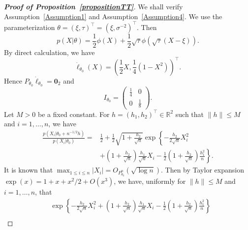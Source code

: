 \documentclass[11pt]{article}
\theoremstyle{plain}
\theoremstyle{definition}
\theoremstyle{remark}
\begin{document}
\begin{appendices}
\begin{proof}[\textbf{Proof of Proposition~\ref{propositionTT}}]
We shall verify Assumption~\ref{Assumption1} and Assumption~\ref{Assumption4}.
We use the parameterization
$
\theta=(\xi,\tau)^\top  =(\xi,\sigma^{-2})^\top $.
Then
\begin{equation*}
    p(X|\theta)=\frac{1}{2}\phi(X)+\frac{1}{2}\sqrt{\tau} \phi(\sqrt{\tau}(X-\xi)).
\end{equation*}
By direct calculation, we have 
\begin{equation*}
    \dot{\ell}_{\theta_0}(X)=\left(\frac{1}{2}X,\frac{1}{4}(1-X^2)\right)^\top .
\end{equation*}
Hence $P_{\theta_0}\dot{\ell}_{\theta_0}=\mathbf{0}_2$ and
\begin{equation*}
    I_{\theta_0}=\begin{pmatrix}
        \frac{1}{4} & 0\\
        0& \frac{1}{8}
    \end{pmatrix}.
\end{equation*}
Let $M>0$ be a fixed constant.  For $h=(h_1,h_2)^\top \in \mathbb{R}^2$ such that $\|h\|\leq M$ and $i=1,\ldots, n$, we have
\begin{equation*}
    \begin{split}
    \frac{p(X_i|\theta_0+n^{-1/2}h)}{p(X_i|\theta_0)}
    =&
    \frac{1}{2}+\frac{1}{2}\sqrt{1+\frac{h_2}{\sqrt{n}}} \exp\left\{-\frac{h_2}{2\sqrt{n}}X_i^2
    \right.
        \\
        &\left.+\left(1+\frac{h_2}{\sqrt{n}}\right) \frac{h_1}{\sqrt{n}} X_i-\frac{1}{2}\left(1+\frac{h_2}{\sqrt{n}}\right)\frac{h_1^2}{n}\right\}.
    \end{split}
\end{equation*}
It is known that $\max_{1\leq i\leq n}|X_i|=O_{P^n_{\theta_0}}(\sqrt{\log n})$.
Then by Taylor expansion $\exp(x)=1+x+x^2/2+O(x^3)$, we have, uniformly for $\|h\|\leq M$ and $i=1,\ldots,n$, that
\begin{align*}
    &\exp\left\{-\frac{h_2}{2\sqrt{n}}X_i^2+\left(1+\frac{h_2}{\sqrt{n}}\right) \frac{h_1}{\sqrt{n}} X_i-\frac{1}{2}\left(1+\frac{h_2}{\sqrt{n}}\right)\frac{h_1^2}{n}\right\}
    \\

\end{align*}
\end{proof}
\end{appendices}
\end{document}
